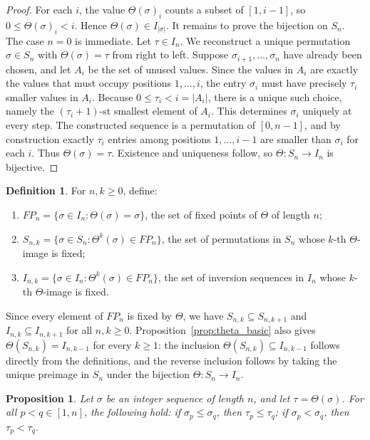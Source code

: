 \documentclass[11pt]{article}
\newtheorem{prop}[thm]{Proposition}
\theoremstyle{remark}
\theoremstyle{definition}
\newtheorem{defn}[thm]{Definition}
\begin{document}
\begin{proof}
For each $i$, the value $\Theta(\sigma)_i$ counts a subset of $[1,i-1]$, so $0\leq \Theta(\sigma)_i<i$. Hence $\Theta(\sigma)\in I_{|\sigma|}$. It remains to prove the bijection on $S_n$. The case $n=0$ is immediate. Let $\tau\in I_n$. We reconstruct a unique permutation $\sigma\in S_n$ with $\Theta(\sigma)=\tau$ from right to left. Suppose $\sigma_{i+1},\ldots,\sigma_n$ have already been chosen, and let $A_i$ be the set of unused values. Since the values in $A_i$ are exactly the values that must occupy positions $1,\ldots,i$, the entry $\sigma_i$ must have precisely $\tau_i$ smaller values in $A_i$. Because $0\leq\tau_i<i=|A_i|$, there is a unique such choice, namely the $(\tau_i+1)$-st smallest element of $A_i$. This determines $\sigma_i$ uniquely at every step. The constructed sequence is a permutation of $[0,n-1]$, and by construction exactly $\tau_i$ entries among positions $1,\ldots,i-1$ are smaller than $\sigma_i$ for each $i$. Thus $\Theta(\sigma)=\tau$. Existence and uniqueness follow, so $\Theta:S_n\to I_n$ is bijective.
\end{proof}

\begin{defn}
For $n,k\geq0$, define:
\begin{enumerate}
    \item[(i)] $FP_n=\{\sigma\in I_n:\Theta(\sigma)=\sigma\}$, the set of
    fixed points of $\Theta$ of length $n$;
    \item[(ii)] $S_{n,k}=\{\sigma\in S_n:\Theta^k(\sigma)\in FP_n\}$, the set
    of permutations in $S_n$ whose $k$-th $\Theta$-image is fixed;
    \item[(iii)] $I_{n,k}=\{\sigma\in I_n:\Theta^k(\sigma)\in FP_n\}$, the set
    of inversion sequences in $I_n$ whose $k$-th $\Theta$-image is fixed.
\end{enumerate}
\end{defn}

Since every element of $FP_n$ is fixed by $\Theta$, we have $S_{n,k}\subseteq S_{n,k+1}$ and $I_{n,k}\subseteq I_{n,k+1}$ for all $n,k\geq0$. Proposition~\ref{prop:theta_basic} also gives $\Theta(S_{n,k})=I_{n,k-1}$ for every $k\geq1$: the inclusion $\Theta(S_{n,k})\subseteq I_{n,k-1}$ follows directly from the definitions, and the reverse inclusion follows by taking the unique preimage in $S_n$ under the bijection $\Theta:S_n\to I_n$.

\begin{prop}\label{prop:order_preserving}
Let $\sigma$ be an integer sequence of length $n$, and let $\tau = \Theta(\sigma)$. For all $p<q \in [1,n]$, the following hold: if $\sigma_p\leq\sigma_q$, then $\tau_p\leq\tau_q$; if $\sigma_p<\sigma_q$, then $\tau_p<\tau_q$.
\end{prop}
\end{document}
